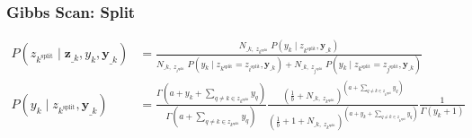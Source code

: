 \documentclass[12pt,letterpaper]{article}
\begin{document}
\subsubsection{Gibbs Scan: Split}
\begin{align}
P(z_{k^\text{split}}\;|\;\mathbf{z}_{\_k}, y_k, \mathbf{y}_{\_k}) &= 
\frac{N_{\_k, \; z_{k^\text{split}}} \; P(y_k\;|\;z_{k^\text{split}}, \mathbf{y}_{\_k})}{N_{\_k, \; z_{i^\text{split}}}\;P(y_k\;|\;z_{k^\text{split}}=z_{i^\text{split}}, \mathbf{y}_{\_k}) + N_{\_k, \; z_{j^\text{split}}}\;P(y_k\;|\;z_{k^\text{split}}=z_{j^\text{split}}, \mathbf{y}_{\_k})}\\[1em]
P(y_k\;|\;z_{k^\text{split}}, \mathbf{y}_{\_k})
&= \frac{\Gamma(a + y_k + \sum_{q\neq k \in z_{k^\text{split}}} y_q)}{\Gamma(a + \sum_{q\neq k \in z_{k^\text{split}} } y_q)} \frac{(\frac{1}{b} + N_{\_k, \; z_{k^\text{split}}})^{(a + \sum_{q\neq k \in z_{k^\text{split}}} y_q)}}{(\frac{1}{b} + 1 + N_{\_k, \; z_{k^\text{split}}})^{(a + y_k + \sum_{q\neq k \in z_{k^\text{split}}} y_q)}}\frac{1}{\Gamma(y_k + 1)}
\end{align}
\end{document}
